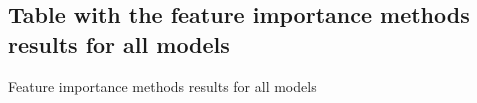 \subsection{Table with the feature importance methods results for all models}
\label{ssec:fi}
\begin{table}[H]
\begin{footnotesize}

\end{footnotesize}
\caption{\label{tab:fi} Feature importance methods results for all models}
\end{table}




